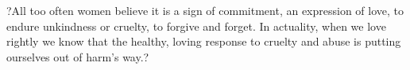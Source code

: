 \documentclass[a4paper, 11pt]{article} %
\begin{document}
?All too often women believe it is a sign of commitment, an expression of love, to endure unkindness or cruelty, to forgive and forget. In actuality, when we love rightly we know that the healthy, loving response to cruelty and abuse is putting ourselves out of harm's way.? \cite{newvisions}



{}


\end{document}
